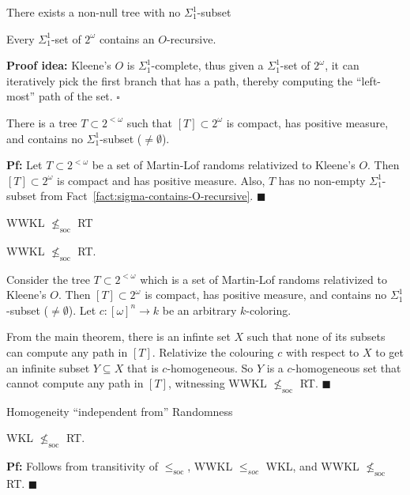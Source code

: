 \begin{frame}{There exists a non-null tree with no $\Sigma_1^1$-subset}
  \begin{fact}
    \label{fact:sigma-contains-O-recursive}
    Every $\Sigma_1^1$-set of $2^\omega$ contains an $O$-recursive.
  \end{fact}
  \textbf{Proof idea:} Kleene's $O$ is $\Sigma_1^1$-complete, thus given a 
  $\Sigma_1^1$-set of $2^\omega$, it can iteratively pick the first branch
  that has a path, thereby computing the ``left-most'' path of the set.
  $\square$

  \vspace{1em}
  \begin{thm}
    There is a tree $T\subset2^{<\omega}$ such that $[T]\subset
    2^\omega$ is compact, has positive measure, and contains no
    $\Sigma_1^1$-subset ($\neq\emptyset$).
  \end{thm}
  \textbf{Pf:} Let $T\subset2^{<\omega}$ be a set of Martin-Lof randoms
  relativized to Kleene's $O$. Then $[T]\subset 2^\omega$ is compact and
  has positive measure. Also, $T$ has no non-empty $\Sigma_1^1$-subset from
  Fact~\ref{fact:sigma-contains-O-recursive}. $\blacksquare$
\end{frame}

\begin{frame}{WWKL $\nleq_{\text{soc}}$ RT}
  \begin{theorem}
    WWKL $\nleq_{\text{soc}}$ RT.
  \end{theorem}

  Consider the tree $T\subset2^{<\omega}$ which is a set of Martin-Lof
  randoms relativized to Kleene's $O$. Then $[T]\subset 2^\omega$ is
  compact, has positive measure, and contains no $\Sigma_1^1$-subset
  ($\neq\emptyset$). Let $c:[\omega]^n\rightarrow k$ be an arbitrary
  $k$-coloring.
  
  \vspace{1em}
  From the main theorem, there is an infinte set $X$ such that none of its
  subsets can compute any path in $[T]$. Relativize the colouring $c$ with
  respect to $X$ to get an infinite subset $Y\subseteq X$ that is
  $c$-homogeneous. So $Y$ is a $c$-homogeneous set that cannot compute
  any path in $[T]$, witnessing WWKL $\nleq_{\text{soc}}$ RT.
  $\blacksquare$
\end{frame}

\begin{frame}{Homogeneity ``independent from'' Randomness}
  \begin{coro}
    WKL $\nleq_{\text{soc}}$ RT.
  \end{coro}
  \textbf{Pf:} Follows from transitivity of $\leq_\text{soc}$,
  WWKL $\leq_{soc}$ WKL, and WWKL $\nleq_{\text{soc}}$ RT. $\blacksquare$

  \begin{center}
  \end{center}
\end{frame}
